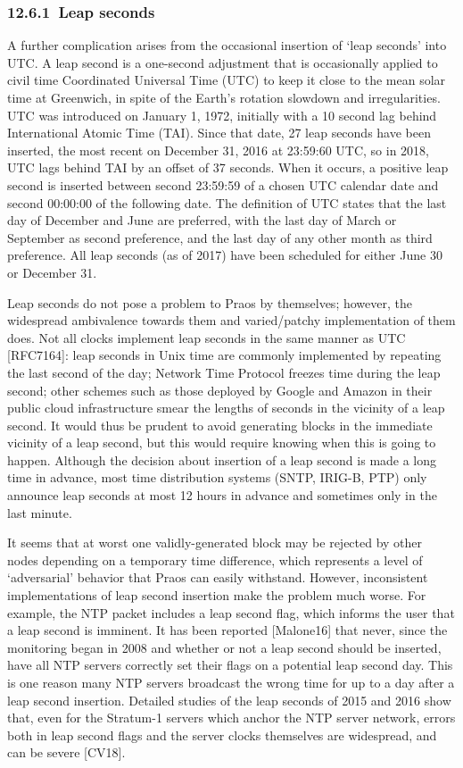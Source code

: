 \documentclass[11pt,a4paper]{article}
\begin{document}
\hypertarget{leap-seconds}{%
\subsubsection{​12.6.1​~Leap seconds}\label{leap-seconds}}

A further complication arises from the occasional insertion of `leap
seconds' into UTC. A leap second is a one-second adjustment that is
occasionally applied to civil time Coordinated Universal Time (UTC) to
keep it close to the mean solar time at Greenwich, in spite of the
Earth's rotation slowdown and irregularities. UTC was introduced on
January 1, 1972, initially with a 10 second lag behind International
Atomic Time (TAI). Since that date, 27 leap seconds have been inserted,
the most recent on December 31, 2016 at 23:59:60 UTC, so in 2018, UTC
lags behind TAI by an offset of 37 seconds. When it occurs, a positive
leap second is inserted between second 23:59:59 of a chosen UTC calendar
date and second 00:00:00 of the following date. The definition of UTC
states that the last day of December and June are preferred, with the
last day of March or September as second preference, and the last day of
any other month as third preference. All leap seconds (as of 2017) have
been scheduled for either June 30 or December 31.

Leap seconds do not pose a problem to Praos by themselves; however, the
widespread ambivalence towards them and varied/patchy implementation of
them does. Not all clocks implement leap seconds in the same manner as
UTC {[}RFC7164{]}: leap seconds in Unix time are commonly implemented by
repeating the last second of the day; Network Time Protocol freezes time
during the leap second; other schemes such as those deployed by Google
and Amazon in their public cloud infrastructure smear the lengths of
seconds in the vicinity of a leap second. It would thus be prudent to
avoid generating blocks in the immediate vicinity of a leap second, but
this would require knowing when this is going to happen. Although the
decision about insertion of a leap second is made a long time in
advance, most time distribution systems (SNTP, IRIG-B, PTP) only
announce leap seconds at most 12 hours in advance and sometimes only in
the last minute.

It seems that at worst one validly-generated block may be rejected by
other nodes depending on a temporary time difference, which represents a
level of `adversarial' behavior that Praos can easily withstand.
However, inconsistent implementations of leap second insertion make the
problem much worse. For example, the NTP packet includes a leap second
flag, which informs the user that a leap second is imminent. It has been
reported {[}Malone16{]} that never, since the monitoring began in 2008
and whether or not a leap second should be inserted, have all NTP
servers correctly set their flags on a potential leap second day. This
is one reason many NTP servers broadcast the wrong time for up to a day
after a leap second insertion. Detailed studies of the leap seconds of
2015 and 2016 show that, even for the Stratum-1 servers which anchor the
NTP server network, errors both in leap second flags and the server
clocks themselves are widespread, and can be severe {[}CV18{]}.
\end{document}

